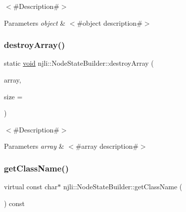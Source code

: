 $<$\#\+Description\#$>$


\begin{DoxyParams}{Parameters}
{\em object} & $<$\#object description\#$>$ \\
\hline
\end{DoxyParams}
\mbox{\label{classnjli_1_1_node_state_builder_a6f19074faac45e8363007f4475a9742c}} 
\subsubsection{\texorpdfstring{destroy\+Array()}{destroyArray()}}
{\footnotesize\ttfamily static \mbox{\hyperlink{_thread_8h_af1e856da2e658414cb2456cb6f7ebc66}{void}} njli\+::\+Node\+State\+Builder\+::destroy\+Array (\begin{DoxyParamCaption}\item[{\mbox{\hyperlink{classnjli_1_1_node_state_builder}{Node\+State\+Builder}} $\ast$$\ast$}]{array,  }\item[{const \mbox{\hyperlink{_util_8h_a10e94b422ef0c20dcdec20d31a1f5049}{u32}}}]{size = {} }\end{DoxyParamCaption})\hspace{0.3cm}{\ttfamily [static]}}

$<$\#\+Description\#$>$


\begin{DoxyParams}{Parameters}
{\em array} & $<$\#array description\#$>$ \\
\hline
\end{DoxyParams}
\mbox{\label{classnjli_1_1_node_state_builder_a3121e4e027fa11034e4eab047eff63d6}} 
\subsubsection{\texorpdfstring{get\+Class\+Name()}{getClassName()}}
{\footnotesize\ttfamily virtual const char$\ast$ njli\+::\+Node\+State\+Builder\+::get\+Class\+Name (\begin{DoxyParamCaption}{ }\end{DoxyParamCaption}) const\hspace{0.3cm}{\ttfamily [virtual]}}

